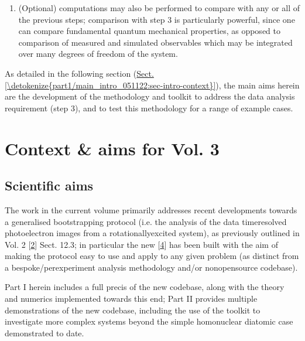 \documentclass[letterpaper,table,10pt,english]{jupyterBook}
\begin{document}
\begin{enumerate}
\item {} 
\sphinxAtStartPar
(Optional)  computations may also be performed to compare with any or all of the previous steps; comparison with step 3 is particularly powerful, since one can compare fundamental quantum mechanical properties, as opposed to comparison of measured and simulated observables which may be integrated over many degrees of freedom of the system.

\end{enumerate}

\sphinxAtStartPar
As detailed in the following section (\hyperref[\detokenize{part1/main_intro_051122:sec-intro-context}]{Sect.\@ \ref{\detokenize{part1/main_intro_051122:sec-intro-context}}}), the main aims herein are the development of the methodology and toolkit to address the data analysis requirement (step 3), and to test this methodology for a range of example cases.


\section{Context \& aims for Vol. 3}
\label{\detokenize{part1/main_intro_051122:context-aims-for-vol-3}}\label{\detokenize{part1/main_intro_051122:sec-intro-context}}

\subsection{Scientific aims}
\label{\detokenize{part1/main_intro_051122:scientific-aims}}
\sphinxAtStartPar
The work in the current volume primarily addresses recent developments towards a generalised bootstrapping protocol (i.e. the analysis of the data time\sphinxhyphen{}resolved photoelectron images from a rotationally\sphinxhyphen{}excited system), as previously outlined in  Vol. 2 {[}\hyperlink{cite.backmatter/bibliography:id570}{2}{]} Sect. 12.3; in particular the new  {[}\hyperlink{cite.backmatter/bibliography:id574}{4}{]} has been built with the aim of making the protocol easy to use and apply to any given problem (as distinct from a bespoke/per\sphinxhyphen{}experiment analysis methodology and/or non\sphinxhyphen{}open\sphinxhyphen{}source codebase).

\sphinxAtStartPar
Part I herein includes a full precis of the new codebase, along with the theory and numerics implemented towards this end; Part II provides multiple demonstrations of the new codebase, including the use of the toolkit to investigate more complex systems beyond the simple homonuclear diatomic case demonstrated to date.
\end{document}
